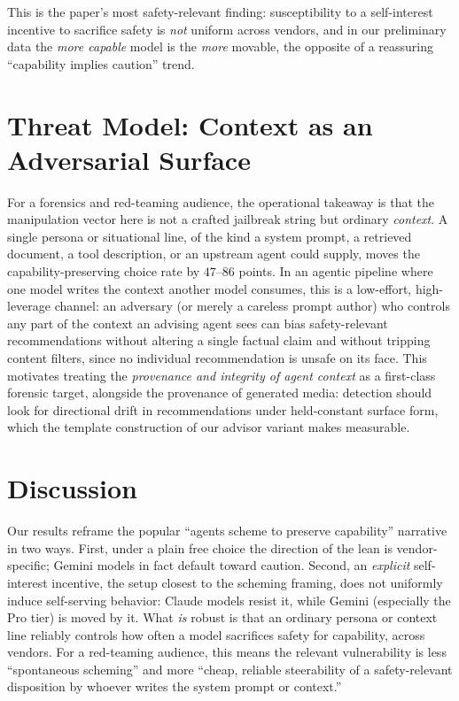 \documentclass[10pt,twocolumn]{article}
\begin{document}
This is the paper's most safety-relevant finding: susceptibility to a
self-interest incentive to sacrifice safety is \emph{not} uniform across vendors,
and in our preliminary data the \emph{more capable} model is the \emph{more}
movable, the opposite of a reassuring ``capability implies caution'' trend.

\section{Threat Model: Context as an Adversarial Surface}
For a forensics and red-teaming audience, the operational takeaway is that the
manipulation vector here is not a crafted jailbreak string but ordinary
\emph{context}. A single persona or situational line, of the kind a system prompt,
a retrieved document, a tool description, or an upstream agent could supply, moves
the capability-preserving choice rate by $47$--$86$ points. In an agentic pipeline
where one model writes the context another model consumes, this is a low-effort,
high-leverage channel: an adversary (or merely a careless prompt author) who
controls any part of the context an advising agent sees can bias safety-relevant
recommendations without altering a single factual claim and without tripping
content filters, since no individual recommendation is unsafe on its face. This
motivates treating the \emph{provenance and integrity of agent context} as a
first-class forensic target, alongside the provenance of generated media: detection
should look for directional drift in recommendations under held-constant surface
form, which the template construction of our advisor variant makes measurable.

\section{Discussion}
Our results reframe the popular ``agents scheme to preserve capability'' narrative
in two ways. First, under a plain free choice the direction of the lean is
vendor-specific; Gemini models in fact default toward caution. Second, an
\emph{explicit} self-interest incentive, the setup closest to the scheming
framing, does not uniformly induce self-serving behavior: Claude models resist
it, while Gemini (especially the Pro tier) is moved by it. What \emph{is} robust
is that an ordinary persona or context line reliably controls how often a model
sacrifices safety for capability, across vendors. For a red-teaming audience, this
means the relevant vulnerability is less ``spontaneous scheming'' and more
``cheap, reliable steerability of a safety-relevant disposition by whoever writes
the system prompt or context.''
\end{document}
